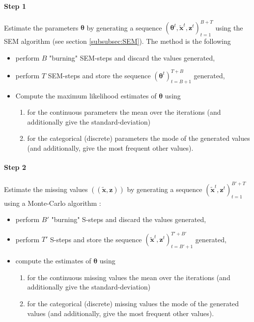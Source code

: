 \documentclass[a4paper,10pt]{article}
\newcommand{\bx}{\mathbf{x}}
\newcommand{\bz}{\mathbf{z}}
\newcommand{\btheta}{\boldsymbol{\theta}}
\begin{document}
\paragraph{Step 1}
Estimate the parameters $\btheta$ by generating a sequence $(\btheta^t,\tilde{\bx}^t,\bz^t)_{t=1}^{B+T}$
using the SEM algorithm (see section \ref{subsubsec:SEM}). The method is the following
\begin{itemize}
 \item perform $B$ "burning" SEM-steps and discard the values generated,
 \item perform $T$ SEM-steps and store the sequence $(\btheta^t)_{t=B+1}^{T+B}$ generated,
 \item Compute the maximum likelihood estimates of $\btheta$ using
 \begin{enumerate}
   \item for the continuous parameters the mean over the iterations (and additionally give the standard-deviation)
   \item for the categorical (discrete) parameters the mode of the generated values (and additionally, give the most frequent
   other values).
 \end{enumerate}
\end{itemize}

\paragraph{Step 2}

Estimate the missing values $((\tilde{\bx},\bz))$ by generating a sequence $(\tilde{\bx}^t,\bz^t)_{t=1}^{B'+T}$
using a Monte-Carlo algorithm :

 \begin{itemize}
 \item perform $B'$ "burning" S-steps and discard the values generated,
 \item perform $T'$ S-steps and store the sequence $(\tilde{\bx}^t,\bz^t)_{t=B'+1}^{T'+B'}$ generated,
 \item compute the estimates of $\btheta$ using
 \begin{enumerate}
   \item for the continuous missing values the mean over the iterations (and additionally give the standard-deviation)
   \item for the categorical (discrete) missing values the mode of the generated values (and additionally, give the most frequent
   other values).
 \end{enumerate}
\end{itemize}
\end{document}
